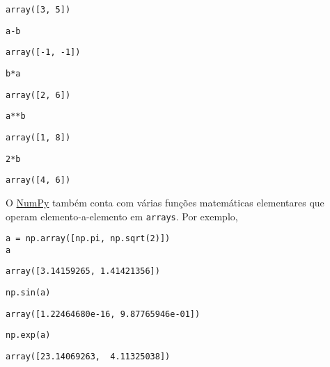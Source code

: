 \documentclass[12pt]{article}
\begin{document}
\begin{verbatim}
array([3, 5])
\end{verbatim}

\begin{lstlisting}
a-b
\end{lstlisting}

\begin{verbatim}
array([-1, -1])
\end{verbatim}

\begin{lstlisting}
b*a
\end{lstlisting}

\begin{verbatim}
array([2, 6])
\end{verbatim}

\begin{lstlisting}
a**b
\end{lstlisting}

\begin{verbatim}
array([1, 8])
\end{verbatim}

\begin{lstlisting}
2*b
\end{lstlisting}

\begin{verbatim}
array([4, 6])
\end{verbatim}


O \href{https://numpy.org/}{NumPy} também conta com várias funções matemáticas elementares que operam elemento-a-elemento em \lstinline+arrays+. Por exemplo,

\begin{lstlisting}
a = np.array([np.pi, np.sqrt(2)])
a
\end{lstlisting}

\begin{verbatim}
array([3.14159265, 1.41421356])
\end{verbatim}

\begin{lstlisting}
np.sin(a)
\end{lstlisting}

\begin{verbatim}
array([1.22464680e-16, 9.87765946e-01])
\end{verbatim}

\begin{lstlisting}
np.exp(a)
\end{lstlisting}

\begin{verbatim}
array([23.14069263,  4.11325038])
\end{verbatim}
\end{document}
